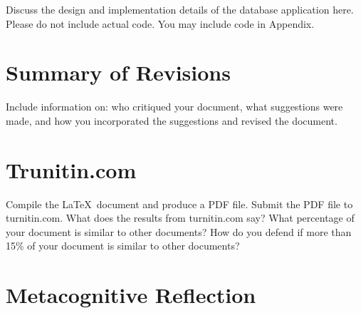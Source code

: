 \documentclass[11pt]{article}
\begin{document}

Discuss the design and implementation details of the database application here. Please do not include actual code. You may include code in Appendix.


\section{Summary of Revisions}


Include information on: who critiqued your document, what suggestions were made, and how you incorporated the suggestions and revised the document.



\section{Trunitin.com} \label{sec:turnitin}

Compile the \LaTeX{}\ document and produce a PDF file. Submit the PDF file to turnitin.com. What does the results from turnitin.com say? What percentage of your document is similar to other documents? How do you defend if more than 15\% of your document is similar to other documents?



\section{Metacognitive Reflection} \label{sec:reflection}


\end{document}
